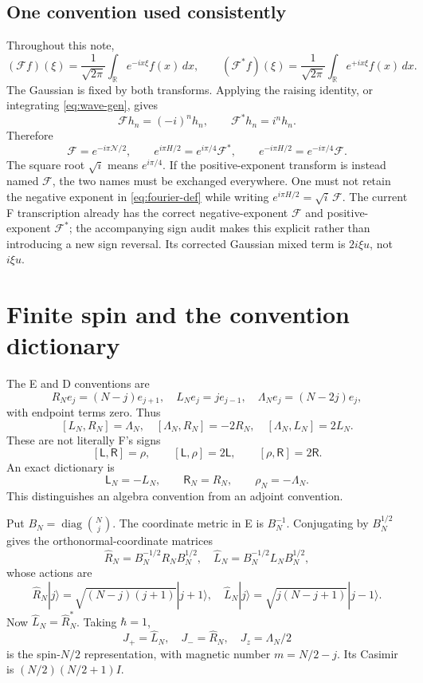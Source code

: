 \documentclass[11pt,reqno]{amsart}
\theoremstyle{remark}\newtheorem{remark}[proposition]{Remark}
\newcommand{\R}{\mathbb R}\newcommand{\F}{\mathcal F}
\newcommand{\Id}{I}\newcommand{\NN}{\mathcal N}
\DeclareMathOperator{\diag}{diag}
\begin{document}
\subsection{One convention used consistently}
Throughout this note,
\begin{equation}\label{eq:fourier-def}
 (\F f)(\xi)=\frac1{\sqrt{2\pi}}\int_\R e^{-ix\xi}f(x)\,dx,
 \qquad
 (\F^*f)(\xi)=\frac1{\sqrt{2\pi}}\int_\R e^{+ix\xi}f(x)\,dx.
\end{equation}
The Gaussian is fixed by both transforms. Applying the raising identity,
or integrating \eqref{eq:wave-gen}, gives
\[
 \F h_n=(-i)^nh_n,\qquad \F^*h_n=i^nh_n.
\]
Therefore
\begin{equation}\label{eq:fourier-osc}
 \boxed{\F=e^{-i\pi\NN/2},\qquad
 e^{i\pi H/2}=e^{i\pi/4}\F^*,\qquad
 e^{-i\pi H/2}=e^{-i\pi/4}\F.}
\end{equation}
The square root $\sqrt i$ means $e^{i\pi/4}$.
If the positive-exponent transform is instead named $\F$, the two names
must be exchanged everywhere. One must not retain the negative exponent
in \eqref{eq:fourier-def} while writing $e^{i\pi H/2}=\sqrt i\,\F$.
The current F transcription already has the correct negative-exponent
$\F$ and positive-exponent $\F^*$; the accompanying sign audit makes this
explicit rather than introducing a new sign reversal. Its corrected
Gaussian mixed term is $2i\xi u$, not $i\xi u$.

\section{Finite spin and the convention dictionary}\label{sec:spin}
The E and D conventions are
\[
 R_Ne_j=(N-j)e_{j+1},\quad L_Ne_j=je_{j-1},\quad
 \Lambda_Ne_j=(N-2j)e_j,
\]
with endpoint terms zero. Thus
\begin{equation}\label{eq:finite-brackets}
 [L_N,R_N]=\Lambda_N,\quad
 [\Lambda_N,R_N]=-2R_N,\quad [\Lambda_N,L_N]=2L_N.
\end{equation}
These are not literally F's signs
\[
 [\mathsf L,\mathsf R]=\rho,\qquad
 [\mathsf L,\rho]=2\mathsf L,\qquad [\rho,\mathsf R]=2\mathsf R.
\]
An exact dictionary is
\begin{equation}\label{eq:sign-dictionary}
 \mathsf L_N=-L_N,\qquad \mathsf R_N=R_N,\qquad \rho_N=-\Lambda_N.
\end{equation}
This distinguishes an algebra convention from an adjoint convention.

Put $B_N=\diag\binom Nj$. The coordinate metric in E is $B_N^{-1}$.
Conjugating by $B_N^{1/2}$ gives the orthonormal-coordinate matrices
\[
 \widehat R_N=B_N^{-1/2}R_NB_N^{1/2},\quad
 \widehat L_N=B_N^{-1/2}L_NB_N^{1/2},
\]
whose actions are
\[
 \widehat R_N|j\rangle=\sqrt{(N-j)(j+1)}|j+1\rangle,\quad
 \widehat L_N|j\rangle=\sqrt{j(N-j+1)}|j-1\rangle.
\]
Now $\widehat L_N=\widehat R_N^*$. Taking $\hbar=1$,
\[
 J_+=\widehat L_N,\quad J_-=\widehat R_N,\quad J_z=\Lambda_N/2
\]
is the spin-$N/2$ representation, with magnetic number $m=N/2-j$.
Its Casimir is $(N/2)(N/2+1)\Id$.
\end{document}
